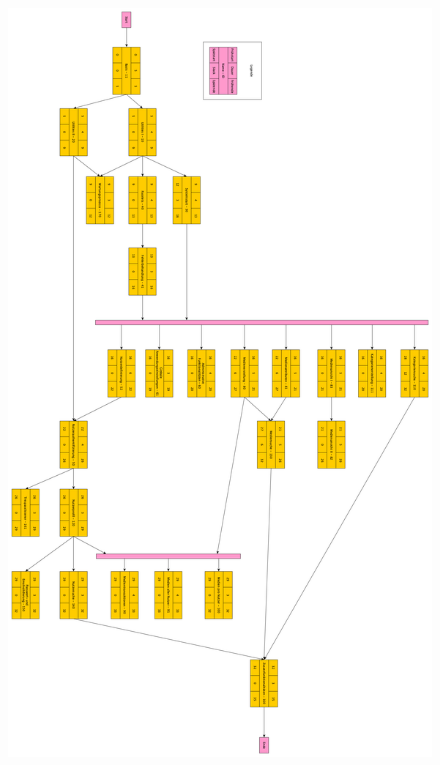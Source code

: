 \documentclass{article}
\begin{document}
\begin{figure}[H]
	\centering
	\includegraphics[width = 38em]{PERT}
\end{figure}

\end{document}
